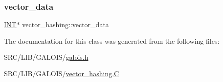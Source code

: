 \mbox{\label{classvector__hashing_a54bff0229c51a54d3b8be5a4e1601a75}} 
\subsubsection{\texorpdfstring{vector\+\_\+data}{vector\_data}}
{\footnotesize\ttfamily \mbox{\hyperlink{galois_8h_a09fddde158a3a20bd2dcadb609de11dc}{I\+NT}}$\ast$ vector\+\_\+hashing\+::vector\+\_\+data}



The documentation for this class was generated from the following files\+:\begin{DoxyCompactItemize}
\item 
S\+R\+C/\+L\+I\+B/\+G\+A\+L\+O\+I\+S/\mbox{\hyperlink{galois_8h}{galois.\+h}}\item 
S\+R\+C/\+L\+I\+B/\+G\+A\+L\+O\+I\+S/\mbox{\hyperlink{vector__hashing_8_c}{vector\+\_\+hashing.\+C}}\end{DoxyCompactItemize}
